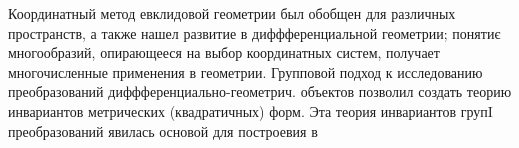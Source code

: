 \documentclass[10pt]{article}
\begin{document}
Координатный метод евклидовой геометрии был обобщен для различных пространств, а также нашел развитие в диффференциальной геометрии; понятиє многообразий, опирающееся на выбор координатных систем, получает многочисленные применения в геометрии. Групповой подход к исследованию преобразований диффференциально-геометрич. объектов позволил создать теорию инвариантов метрических (квадратичных) форм. Эта теория инвариантов групI преобразований явилась основой для построевия в
\end{document}
